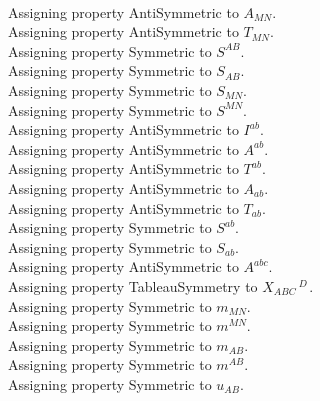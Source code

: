 \documentclass[11pt]{article}
\begin{document}
\\
Assigning property AntiSymmetric to ${A}_{M N}$.
\\
Assigning property AntiSymmetric to ${T}_{M N}$.
\\
Assigning property Symmetric to ${S}^{A B}$.
\\
Assigning property Symmetric to ${S}_{A B}$.
\\
Assigning property Symmetric to ${S}_{M N}$.
\\
Assigning property Symmetric to ${S}^{M N}$.
\\
Assigning property AntiSymmetric to ${I}^{a b}$.
\\
Assigning property AntiSymmetric to ${A}^{a b}$.
\\
Assigning property AntiSymmetric to ${T}^{a b}$.
\\
Assigning property AntiSymmetric to ${A}_{a b}$.
\\
Assigning property AntiSymmetric to ${T}_{a b}$.
\\
Assigning property Symmetric to ${S}^{a b}$.
\\
Assigning property Symmetric to ${S}_{a b}$.
\\
Assigning property AntiSymmetric to ${A}^{a b c}$.
\\
Assigning property TableauSymmetry to ${X}_{A B C}\,^{D\, }$.
\\
Assigning property Symmetric to ${m}_{M N}$.
\\
Assigning property Symmetric to ${m}^{M N}$.
\\
Assigning property Symmetric to ${m}_{A B}$.
\\
Assigning property Symmetric to ${m}^{A B}$.
\\
Assigning property Symmetric to ${u}_{A B}$.
\\
\end{document}
